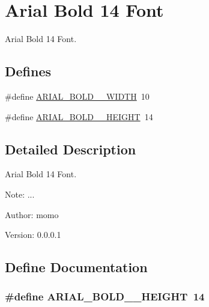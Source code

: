 \hypertarget{group__graphic__device__font__arial14}{
\section{Arial Bold 14 Font}
\label{group__graphic__device__font__arial14}
}
Arial Bold 14 Font.  


\subsection*{Defines}
\begin{CompactItemize}
\item 
\#define \hyperlink{group__graphic__device__font__arial14_gea609b33503f156623ed45a35d449754}{ARIAL\_\-BOLD\_\_\-WIDTH}~10
\item 
\#define \hyperlink{group__graphic__device__font__arial14_gcffe3e6f04dad38f6ec40a947d91718b}{ARIAL\_\-BOLD\_\_\-HEIGHT}~14
\end{CompactItemize}


\subsection{Detailed Description}
Arial Bold 14 Font. 

\begin{Desc}
\item[Note:]... \end{Desc}
\begin{Desc}
\item[Author:]momo \end{Desc}
\begin{Desc}
\item[Version:]0.0.0.1 \end{Desc}


\subsection{Define Documentation}
\hypertarget{group__graphic__device__font__arial14_gcffe3e6f04dad38f6ec40a947d91718b}{
\subsubsection[{ARIAL\_\-BOLD\_\-14\_\-HEIGHT}]{\setlength{\rightskip}{0pt plus 5cm}\#define ARIAL\_\-BOLD\_\_\-HEIGHT~14}}
\label{group__graphic__device__font__arial14_gcffe3e6f04dad38f6ec40a947d91718b}


